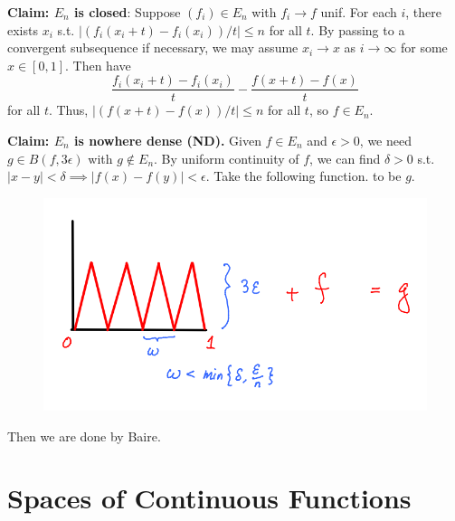 \documentclass{article}
\theoremstyle{definition}
\theoremstyle{remark}
\theoremstyle{plain}
\begin{document}
\textbf{Claim: $E_n$ is closed}: Suppose $(f_i)\in E_n$ with $f_i\to f$ unif. For each $i$, there exists $x_i$ s.t. $|(f_i(x_i+t)-f_i(x_i))/t|\le n$ for all $t$. By passing to a convergent subsequence if necessary, we may assume $x_i\to x$ as $i\to\infty$ for some $x\in [0,1]$. Then have
\[\dfrac{f_i(x_i+t)-f_i(x_i)}{t}-\dfrac{f(x+t)-f(x)}{t}\]
for all $t$. Thus, $|(f(x+t)-f(x))/t|\le n$ for all $t$, so $f\in E_n$.

\textbf{Claim: $E_n$ is nowhere dense (ND).} Given $f\in E_n$ and $\epsilon>0$, we need $g\in B(f,3\epsilon)$ with $g\not\in E_n$. By uniform continuity of $f$, we can find $\delta>0$ s.t. $|x-y|<\delta\implies |f(x)-f(y)|<\epsilon$. Take the following function. to be $g$.
\begin{figure}[H]
    \centering
    \includegraphics[width=0.5\linewidth]{Mich/pictures/LA-non-diff-func.PNG}
\end{figure}
Then we are done by Baire.

\section{Spaces of Continuous Functions}
\end{document}
